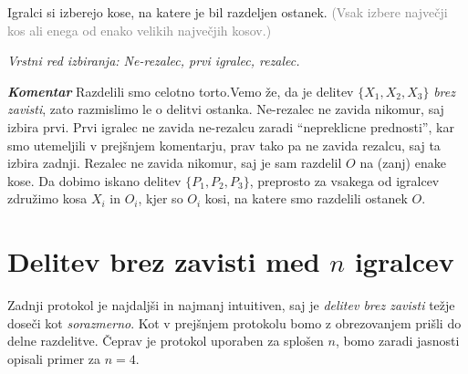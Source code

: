 \documentclass[a4paper,12pt]{article}
\begin{document}
\begin{protokol}
\item Igralci si izberejo kose, na katere je bil razdeljen ostanek. \textcolor{gray}{(Vsak izbere največji kos ali enega od enako velikih največjih kosov.)}

\textsl{Vrstni red izbiranja: Ne-rezalec, prvi igralec, rezalec.}

\item [\textbf{\em Komentar}] Razdelili smo celotno torto.Vemo že, da je delitev ${\{X_1, X_2, X_3\}}$ {\em brez zavisti}, zato razmislimo le o delitvi ostanka. Ne-rezalec ne zavida nikomur, saj izbira prvi. Prvi igralec ne zavida ne-rezalcu zaradi ``nepreklicne prednosti'', kar smo utemeljili v prejšnjem komentarju, prav tako pa ne zavida rezalcu, saj ta izbira zadnji. Rezalec ne zavida nikomur, saj je sam razdelil $O$ na (zanj) enake kose. Da dobimo iskano delitev ${\{P_1, P_2, P_3\}}$, preprosto za vsakega od igralcev združimo kosa $X_i$ in $O_i$, kjer so $O_i$ kosi, na katere smo razdelili ostanek $O$.

\end{protokol}

\section{Delitev brez zavisti med $n$ igralcev}

Zadnji protokol je najdaljši in najmanj intuitiven, saj je {\em delitev brez zavisti} težje doseči kot {\em sorazmerno}. Kot v prejšnjem protokolu bomo z obrezovanjem prišli do delne razdelitve.
Čeprav je protokol uporaben za splošen $n$, bomo zaradi jasnosti opisali primer za $n = 4$. 

\end{document}
